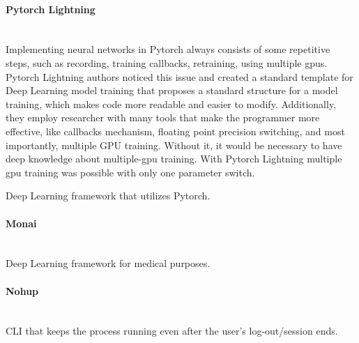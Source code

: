 \paragraph{Pytorch Lightning}\mbox{}\\
\indent Implementing neural networks in Pytorch always consists of some repetitive steps, such as recording, training callbacks, retraining, using multiple gpus. Pytorch Lightning authors noticed this issue and created a standard template for Deep Learning model training that proposes a standard structure for a model training, which makes code more readable and easier to modify. Additionally, they employ researcher with many tools that make the programmer more effective, like callbacks mechanism, floating point precision switching, and most importantly, multiple GPU training. Without it, it would be necessary to have deep knowledge about multiple-gpu training. With Pytorch Lightning multiple gpu training was possible with only one parameter switch. 

Deep Learning framework that utilizes Pytorch. 
\paragraph{Monai}\mbox{}\\
\indent Deep Learning framework for medical purposes.
\paragraph{Nohup}\mbox{}\\
\indent CLI that keeps the process running even after the user's log-out/session ends.